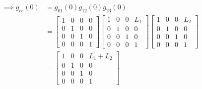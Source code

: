 \begin{align*}
    \implies
    g_{e e}(0)
     & =
    g_{0 1}(0) g_{1 2}(0) g_{2 3}(0)
    \\ & =
    \begin{bmatrix}
        1 & 0 & 0 & 0 \\
        0 & 1 & 0 & 0 \\
        0 & 0 & 1 & 0 \\
        0 & 0 & 0 & 1
    \end{bmatrix}
    \begin{bmatrix}
        1 & 0 & 0 & L_1 \\
        0 & 1 & 0 & 0   \\
        0 & 0 & 1 & 0   \\
        0 & 0 & 0 & 1
    \end{bmatrix}
    \begin{bmatrix}
        1 & 0 & 0 & L_2 \\
        0 & 1 & 0 & 0   \\
        0 & 0 & 1 & 0   \\
        0 & 0 & 0 & 1
    \end{bmatrix}
    \\ & =
    \begin{bmatrix}
        1 & 0 & 0 & L_1 + L_2 \\
        0 & 1 & 0 & 0         \\
        0 & 0 & 1 & 0         \\
        0 & 0 & 0 & 1
    \end{bmatrix}
\end{align*}
